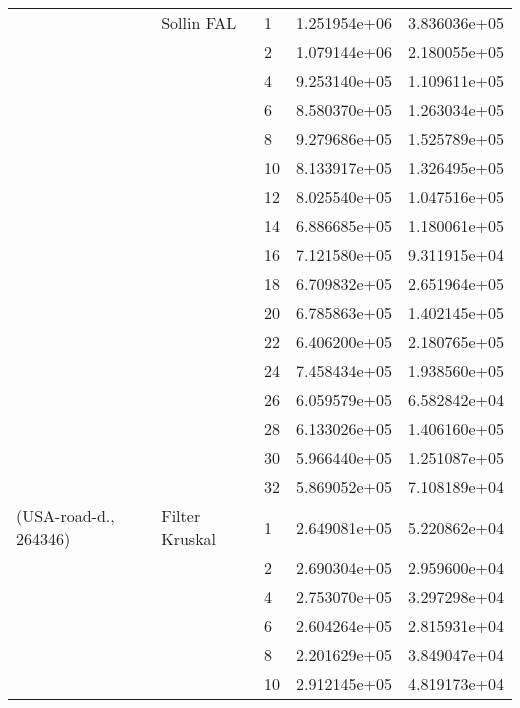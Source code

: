 \begin{tabular}{lllrr}
                      & Sollin FAL & 1  &  1.251954e+06 &  3.836036e+05 \\
                      &            & 2  &  1.079144e+06 &  2.180055e+05 \\
                      &            & 4  &  9.253140e+05 &  1.109611e+05 \\
                      &            & 6  &  8.580370e+05 &  1.263034e+05 \\
                      &            & 8  &  9.279686e+05 &  1.525789e+05 \\
                      &            & 10 &  8.133917e+05 &  1.326495e+05 \\
                      &            & 12 &  8.025540e+05 &  1.047516e+05 \\
                      &            & 14 &  6.886685e+05 &  1.180061e+05 \\
                      &            & 16 &  7.121580e+05 &  9.311915e+04 \\
                      &            & 18 &  6.709832e+05 &  2.651964e+05 \\
                      &            & 20 &  6.785863e+05 &  1.402145e+05 \\
                      &            & 22 &  6.406200e+05 &  2.180765e+05 \\
                      &            & 24 &  7.458434e+05 &  1.938560e+05 \\
                      &            & 26 &  6.059579e+05 &  6.582842e+04 \\
                      &            & 28 &  6.133026e+05 &  1.406160e+05 \\
                      &            & 30 &  5.966440e+05 &  1.251087e+05 \\
                      &            & 32 &  5.869052e+05 &  7.108189e+04 \\
(USA-road-d., 264346) & Filter Kruskal & 1  &  2.649081e+05 &  5.220862e+04 \\
                      &            & 2  &  2.690304e+05 &  2.959600e+04 \\
                      &            & 4  &  2.753070e+05 &  3.297298e+04 \\
                      &            & 6  &  2.604264e+05 &  2.815931e+04 \\
                      &            & 8  &  2.201629e+05 &  3.849047e+04 \\
                      &            & 10 &  2.912145e+05 &  4.819173e+04 \\

\end{tabular}
